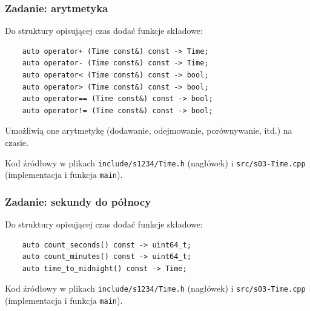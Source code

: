 \documentclass[aspectratio=169]{beamer}
\begin{document}
\begin{frame}[fragile]
    \frametitle{Zadanie: arytmetyka}
    \label{lecture_exercise_3}

    Do struktury opisującej czas dodać funkcje składowe:

    {\scriptsize
    \begin{lstlisting}
    auto operator+ (Time const&) const -> Time;
    auto operator- (Time const&) const -> Time;
    auto operator< (Time const&) const -> bool;
    auto operator> (Time const&) const -> bool;
    auto operator== (Time const&) const -> bool;
    auto operator!= (Time const&) const -> bool;
    \end{lstlisting}}

    Umożliwią one arytmetykę (dodawanie, odejmowanie, porównywanie, itd.) na czasie.

    \vspace{1em}

    Kod źródłowy w plikach {\tt include/s1234/Time.h} (nagłówek) i
    {\tt src/s03-Time.cpp} (implementacja i funkcja {\tt main}).
\end{frame}

\begin{frame}[fragile]
    \frametitle{Zadanie: sekundy do północy}
    \label{lecture_exercise_3}

    Do struktury opisującej czas dodać funkcje składowe:

    {\scriptsize
    \begin{lstlisting}
    auto count_seconds() const -> uint64_t;
    auto count_minutes() const -> uint64_t;
    auto time_to_midnight() const -> Time;
    \end{lstlisting}}

    \vspace{1em}

    Kod źródłowy w plikach {\tt include/s1234/Time.h} (nagłówek) i
    {\tt src/s03-Time.cpp} (implementacja i funkcja {\tt main}).
\end{frame}



\end{document}
